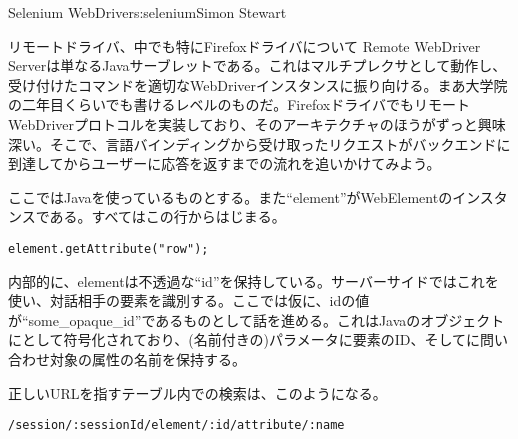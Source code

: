 \begin{aosachapter}{Selenium WebDriver}{s:selenium}{Simon Stewart}
\begin{aosasect1}{リモートドライバ、中でも特にFirefoxドライバについて}
Remote WebDriver Serverは単なるJavaサーブレットである。これはマルチプレクサとして動作し、受け付けたコマンドを適切なWebDriverインスタンスに振り向ける。まあ大学院の二年目くらいでも書けるレベルのものだ。FirefoxドライバでもリモートWebDriverプロトコルを実装しており、そのアーキテクチャのほうがずっと興味深い。そこで、言語バインディングから受け取ったリクエストがバックエンドに到達してからユーザーに応答を返すまでの流れを追いかけてみよう。


ここではJavaを使っているものとする。また``element''がWebElementのインスタンスである。すべてはこの行からはじまる。

\begin{verbatim}
element.getAttribute("row");
\end{verbatim}

\noindent 内部的に、elementは不透過な``id''を保持している。サーバーサイドではこれを使い、対話相手の要素を識別する。ここでは仮に、idの値が``some\_opaque\_id''であるものとして話を進める。これはJavaのオブジェクトにとして符号化されており、(名前付きの)パラメータに要素のID、そしてに問い合わせ対象の属性の名前を保持する。

正しいURLを指すテーブル内での検索は、このようになる。

\begin{verbatim}
/session/:sessionId/element/:id/attribute/:name
\end{verbatim}


\end{aosasect1}
\end{aosachapter}
